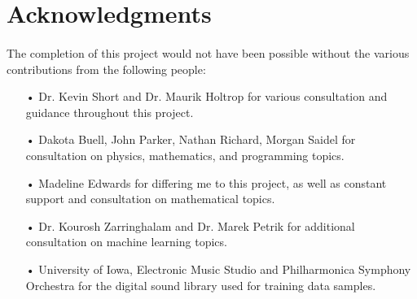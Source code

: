 \documentclass[12pt,letterpaper]{article}
\begin{document}

\newpage
\section{Acknowledgments}
\label{sec-Acknowledge}

\paragraph*{}The completion of this project would not have been possible without the various contributions from the following people:

\begin{itemize}

\item[•]Dr. Kevin Short and Dr. Maurik Holtrop for various consultation and guidance throughout this project.

\item[•]Dakota Buell, John Parker, Nathan Richard, Morgan Saidel for consultation on physics, mathematics, and programming topics.

\item[•]Madeline Edwards for differing me to this project, as well as constant support and consultation on mathematical topics.

\item[•]Dr. Kourosh Zarringhalam and Dr. Marek Petrik for additional consultation on machine learning topics.

\item[•]University of Iowa, Electronic Music Studio and Philharmonica Symphony Orchestra for the digital sound library used for training data samples.

\end{itemize}


\newpage
\end{document}
